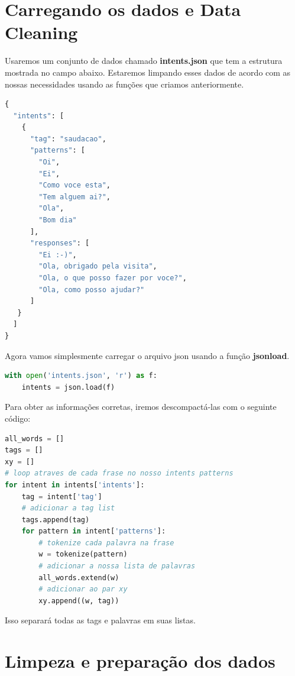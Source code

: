 \section[Carregando os dados e Data Cleaning]{Carregando os dados e Data Cleaning}
Usaremos um conjunto de dados chamado  \textbf{intents.json} que tem a estrutura mostrada no campo abaixo. Estaremos limpando esses dados de acordo com as nossas necessidades usando as funções que criamos anteriormente.

\begin{lstlisting}[language=python, caption=Data intents.json]
{
  "intents": [
    {
      "tag": "saudacao",
      "patterns": [
        "Oi",
        "Ei",
        "Como voce esta",
        "Tem alguem ai?",
        "Ola",
        "Bom dia"
      ],
      "responses": [
        "Ei :-)",
        "Ola, obrigado pela visita",
        "Ola, o que posso fazer por voce?",
        "Ola, como posso ajudar?"
      ]
   }
  ]
}


\end{lstlisting}
Agora vamos simplesmente carregar o arquivo json usando a função \textbf{jsonload}.

\begin{lstlisting}[language=Python, caption=Python Carregando dados]
with open('intents.json', 'r') as f:
    intents = json.load(f)
\end{lstlisting}

Para obter as informações corretas, iremos descompactá-las com o seguinte código:

\begin{lstlisting}[language=Python, caption=Python Loop nos dados]
all_words = []
tags = []
xy = []
# loop atraves de cada frase no nosso intents patterns
for intent in intents['intents']:
    tag = intent['tag']
    # adicionar a tag list
    tags.append(tag)
    for pattern in intent['patterns']:
        # tokenize cada palavra na frase
        w = tokenize(pattern)
        # adicionar a nossa lista de palavras
        all_words.extend(w)
        # adicionar ao par xy
        xy.append((w, tag))

\end{lstlisting}
Isso separará todas as tags e palavras em suas listas.

\section[Limpeza e preparação dos dados]{Limpeza e preparação dos dados}


